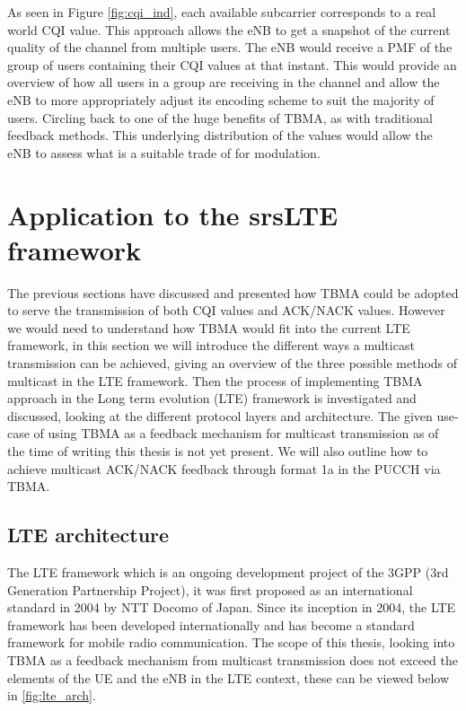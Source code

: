 \documentclass{article}
\begin{document}
As seen in Figure \ref{fig:cqi_ind}, each available subcarrier corresponds to a real world CQI value. This approach allows the eNB to get a snapshot of the current quality of the channel from multiple users. The eNB would receive a PMF of the group of users containing their CQI values at that instant. This would provide an overview of how all users in a group are receiving in the channel and allow the eNB to more appropriately adjust its encoding scheme to suit the majority of users. Circling back to one of the huge benefits of TBMA, as with traditional feedback methods. This underlying distribution of the values would allow the \ac{eNB} to assess what is a suitable trade of for modulation.

\newpage
\section{Application to the srsLTE framework}\label{lte_app}
The previous sections have discussed and presented how TBMA could be adopted to serve the transmission of both CQI values and ACK/NACK values. However we would need to understand how TBMA would fit into the current LTE framework, in this section we will introduce the different ways a multicast transmission can be achieved, giving an overview of the three possible methods of multicast in the LTE framework. Then the process of implementing TBMA approach in the Long term evolution (LTE) framework is investigated and discussed, looking at the different protocol layers and architecture. The given use-case of using TBMA as a feedback mechanism for multicast transmission as of the time of writing this thesis is not yet present.  We will also outline how to achieve multicast ACK/NACK feedback through format 1a in the PUCCH via \ac{TBMA}.

\subsection{LTE architecture}
The LTE framework which is an ongoing development project of the 3GPP (3rd Generation Partnership Project), it was first proposed as an international standard in 2004 by NTT Docomo of Japan. Since its inception in 2004, the LTE framework has been developed internationally and has become a standard framework for mobile radio communication. The scope of this thesis, looking into TBMA as a feedback mechanism from multicast transmission does not exceed the elements of the UE and the eNB in the LTE context, these can be viewed below in \cref{fig:lte_arch}.
\end{document}
